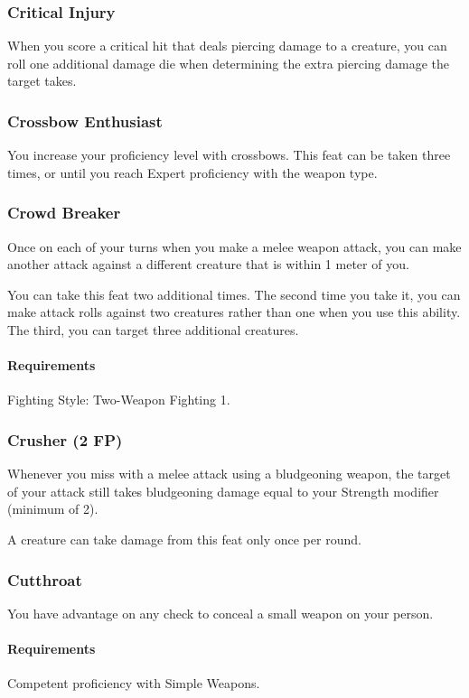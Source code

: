 \subsubsection{Critical Injury} \label{feat::criticalinjury}
    When you score a critical hit that deals piercing damage to a creature, you can roll one additional damage die when determining the extra piercing damage the target takes.
\subsubsection{Crossbow Enthusiast} \label{feat::crossbowenthusiast}
    You increase your proficiency level with crossbows.
    This feat can be taken three times, or until you reach Expert proficiency with the weapon type.
\subsubsection{Crowd Breaker} \label{feat::crowdbreaker}
    Once on each of your turns when you make a melee weapon attack, you can make another attack against a different creature that is within 1 meter of you.

    You can take this feat two additional times.
    The second time you take it, you can make attack rolls against two creatures rather than one when you use this ability.
    The third, you can target three additional creatures.
    \paragraph{Requirements} Fighting Style: Two-Weapon Fighting 1.
\subsubsection{Crusher (2 FP)} \label{feat::crusher}
    Whenever you miss with a melee attack using a bludgeoning weapon, the target of your attack still takes bludgeoning damage equal to your Strength modifier (minimum of 2).

    A creature can take damage from this feat only once per round.
\subsubsection{Cutthroat} \label{feat::cutthroat}
    You have advantage on any check to conceal a small weapon on your person.
    \paragraph{Requirements} Competent proficiency with Simple Weapons.
